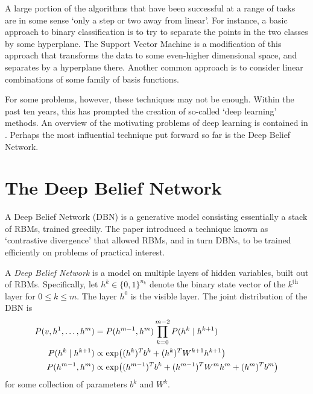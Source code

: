 \documentclass[11pt,titlepage]{article}
\begin{document}
    A large portion of the algorithms that have been successful at a range of
    tasks are in some sense `only a step or two away from linear'.  For
    instance, a basic approach to binary classification is to try to separate
    the points in the two classes by some hyperplane.  The Support Vector
    Machine is a modification of this approach that transforms the data to some
    even-higher dimensional space, and separates by a hyperplane there.  Another
    common approach is to consider linear combinations of some family of basis
    functions.

    For some problems, however, these techniques may not be enough.  Within the
    past ten years, this has prompted the creation of so-called `deep learning'
    methods.  An overview of the motivating problems of deep learning is
    contained in \cite{Ben09}.  Perhaps the most influential technique put forward so far is the
    Deep Belief Network.

\section{The Deep Belief Network}
    A Deep Belief Network (DBN) is a generative model consisting essentially a
    stack of RBMs, trained greedily.  The paper \cite{Hin07} introduced a
    technique known as `contrastive divergence' that allowed RBMs, and in turn
    DBNs, to be trained efficiently on problems of practical interest.
    \begin{definition}
    A \emph{Deep Belief Network} is a model on multiple layers of hidden
    variables, built out of RBMs.  Specifically, let $h^k \in \{0,1\}^{n_k}$
    denote the binary state vector of the $k^{\text{th}}$ layer for $0 \le k \le
    m$.  The layer $h^0$ is the visible layer.  The joint distribution of the
    DBN is
    \begin{align*}
        P(v,h^1, \ldots, h^m) &= P(h^{m-1}, h^m) \prod_{k=0}^{m-2} P(h^k \mid h^{k+1})\\
        P(h^k\mid h^{k+1}) &\propto \exp\pdil*{(h^k)^Tb^k + (h^k)^T W^{k+1} h^{k+1}}\\
        P(h^{m-1}, h^{m}) &\propto  \exp\pdil*{(h^{m-1})^T b^k + (h^{m-1})^T W^m
        h^m + (h^m)^T b^m}
    \end{align*}
    for some collection of parameters $b^k$ and $W^k$.
    \end{definition}
\end{document}
